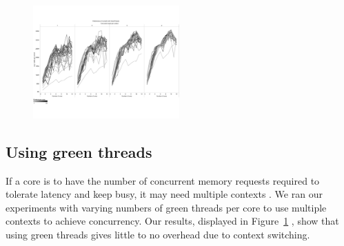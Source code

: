 \begin{figure}
	\begin{center}
 		\includegraphics[width=0.5\textwidth]{figures/multi-core-green-thread-1gb.pdf}
	\end{center}
	\caption{}
	\label{fig:listwalk-green-threads}
\end{figure}

\subsection{Using green threads}
	If a core is to have the number of concurrent memory requests required to tolerate latency and keep busy, it may need multiple contexts .  We ran our experiments with varying numbers of green threads per core to use multiple contexts to achieve concurrency. Our results, displayed in Figure~\ref{fig:listwalk-green-threads} , show that using green threads gives little to no overhead due to context switching. 


